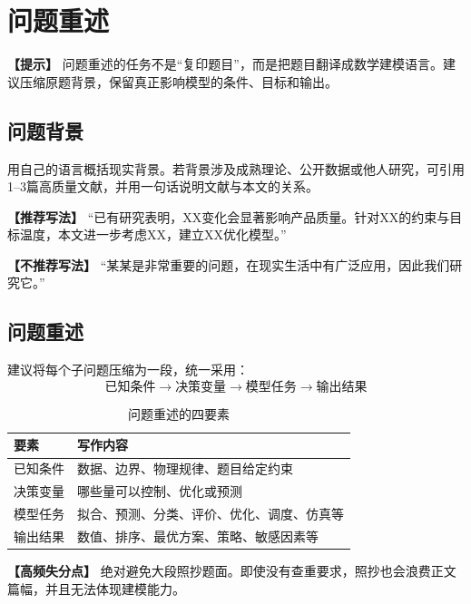\documentclass[12pt,a4paper]{article}
\newcommand{\tip}[1]{\par\noindent\textbf{【提示】} #1\par}
\newcommand{\warning}[1]{\par\noindent\textbf{【高频失分点】} #1\par}
\newcommand{\good}[1]{\par\noindent\textbf{【推荐写法】} #1\par}
\newcommand{\bad}[1]{\par\noindent\textbf{【不推荐写法】} #1\par}
\begin{document}

 

\clearpage

\section{问题重述}

\tip{问题重述的任务不是“复印题目”，而是把题目翻译成数学建模语言。建议压缩原题背景，保留真正影响模型的条件、目标和输出。}

\subsection{问题背景}

用自己的语言概括现实背景。若背景涉及成熟理论、公开数据或他人研究，可引用1--3篇高质量文献，并用一句话说明文献与本文的关系。\

\good{“已有研究表明，XX变化会显著影响产品质量。针对XX的约束与目标温度，本文进一步考虑XX，建立XX优化模型。”}
\bad{“某某是非常重要的问题，在现实生活中有广泛应用，因此我们研究它。”}

\subsection{问题重述}

建议将每个子问题压缩为一段，统一采用：
\[
\text{已知条件}\rightarrow\text{决策变量}\rightarrow\text{模型任务}\rightarrow\text{输出结果}
\]

\begin{table}[H]
\centering
\caption{问题重述的四要素}
\begin{tabular}{p{3cm}p{10cm}}
\toprule
要素 & 写作内容 \\
\midrule
已知条件 & 数据、边界、物理规律、题目给定约束 \\
决策变量 & 哪些量可以控制、优化或预测 \\
模型任务 & 拟合、预测、分类、评价、优化、调度、仿真等 \\
输出结果 & 数值、排序、最优方案、策略、敏感因素等 \\
\bottomrule
\end{tabular}
\end{table}

\warning{绝对避免大段照抄题面。即使没有查重要求，照抄也会浪费正文篇幅，并且无法体现建模能力。}
\end{document}
